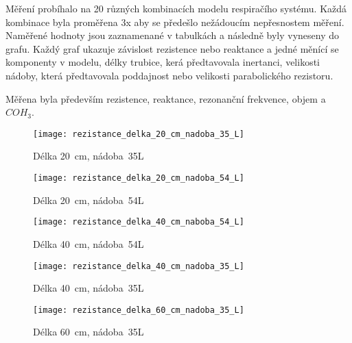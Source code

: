 Měření probíhalo na 20 různých kombinacích modelu respiračího systému. Každá kombinace byla proměřena 3x aby se předešlo nežádoucím nepřesnostem měření. Naměřené hodnoty jsou zaznamenané v tabulkách a následně byly vyneseny do grafu. Každý graf ukazuje závislost rezistence nebo reaktance a jedné měnící se komponenty v modelu, délky trubice, kerá předtavovala inertanci, velikosti nádoby, která předtavovala poddajnost nebo velikosti parabolického rezistoru.

Měřena byla především rezistence, reaktance, rezonanční frekvence, objem a $COH_{3}$. 

\begin{figure}[ht]
	\label{img:pic_rezistance_delka_20_cm_nadoba_35_L}
	\begin{center}
		\texttt{[image: rezistance\_delka\_20\_cm\_nadoba\_35\_L]}
		\caption{Délka 20~cm, nádoba~35L}
	\end{center}
\end{figure}

\begin{figure}[ht]
	\label{img:pic_rezistance_delka_20_cm_nadoba_54_L}
	\begin{center}
		\texttt{[image: rezistance\_delka\_20\_cm\_nadoba\_54\_L]}
		\caption{Délka 20~cm, nádoba~54L}
	\end{center}
\end{figure}

\begin{figure}[ht]
	\label{img:pic_rezistance_delka_40_cm_naboba_54_L}
	\begin{center}
		\texttt{[image: rezistance\_delka\_40\_cm\_naboba\_54\_L]}
		\caption{Délka 40~cm, nádoba~54L}
	\end{center}
\end{figure}

\begin{figure}[ht]
	\label{img:pic_rezistance_delka_40_cm_nadoba_35_L}
	\begin{center}
		\texttt{[image: rezistance\_delka\_40\_cm\_nadoba\_35\_L]}
		\caption{Délka 40~cm, nádoba~35L}
	\end{center}
\end{figure}

\begin{figure}[ht]
	\label{img:pic_rezistance_delka_60_cm_nadoba_35_L}
	\begin{center}
		\texttt{[image: rezistance\_delka\_60\_cm\_nadoba\_35\_L]}
		\caption{Délka 60~cm, nádoba~35L}
	\end{center}
\end{figure}

